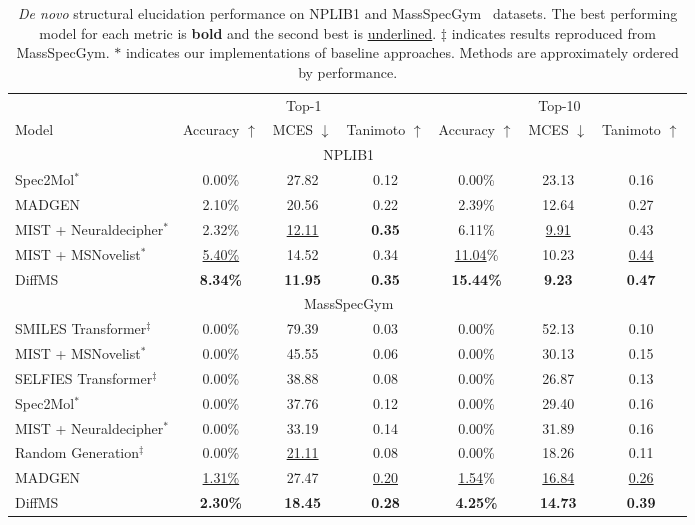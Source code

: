 \documentclass{article}
\theoremstyle{plain}
\theoremstyle{definition}
\theoremstyle{remark}
\begin{document}
\begin{table*}[t]
\caption{\textit{De novo} structural elucidation performance on NPLIB1 \citep{duhrkop2021canopus} and MassSpecGym~\citep{bushuiev2024massspecgymbenchmarkdiscoveryidentification} datasets. The best performing model for each metric is \textbf{bold} and the second best is \underline{underlined}. $\ddag$ indicates results reproduced from MassSpecGym.
$*$ indicates our implementations of baseline approaches. Methods are approximately ordered by performance.
}
\vspace{-0.05in}
\label{table:main}
\begin{center}
{
\begin{tabular}{lcccccc}
\toprule
& \multicolumn{3}{c}{Top-1} & \multicolumn{3}{c}{Top-10} \\
\cmidrule(lr){2-4}
\cmidrule(lr){5-7}
Model & Accuracy $\uparrow$ & MCES $\downarrow$ & Tanimoto $\uparrow$ & Accuracy $\uparrow$ & MCES $\downarrow$ & Tanimoto $\uparrow$ \\
\midrule
\midrule
& \multicolumn{4}{c}{NPLIB1} & & \\
\midrule
Spec2Mol$^*$ & 0.00\% & 27.82 & 0.12 & 0.00\% & 23.13 & 0.16 \\
MADGEN & 2.10\% & 20.56 & 0.22 & 2.39\% & 12.64 & 0.27 \\
MIST + Neuraldecipher$^*$ & 2.32\% & \underline{12.11} & \textbf{0.35} & 6.11\% & \underline{9.91} & 0.43 \\
MIST + MSNovelist$^*$ & \underline{5.40\%} & 14.52 & 0.34 & \underline{11.04}\% & 10.23 & \underline{0.44} \\
DiffMS & \textbf{8.34\%} & \textbf{11.95} & \textbf{0.35} & \textbf{15.44\%} & \textbf{9.23} & \textbf{0.47} \\
\midrule
& \multicolumn{4}{c}{MassSpecGym} & & \\
\midrule
SMILES Transformer$^\ddag$ & 0.00\% &  79.39 & 0.03 & 0.00\% & 52.13 & 0.10 \\
MIST + MSNovelist$^*$ & 0.00\% & 45.55 & 0.06 & 0.00\% & 30.13 & 0.15 \\
SELFIES Transformer$^\ddag$ & 0.00\% & 38.88 & 0.08 & 0.00\% & 26.87 & 0.13 \\
Spec2Mol$^*$ & 0.00\% & 37.76 & 0.12 & 0.00\% & 29.40 & 0.16\\
MIST + Neuraldecipher$^*$ & 0.00\% & 33.19 & 0.14 & 0.00\% & 31.89 & 0.16 \\
Random Generation$^\ddag$ & 0.00\% & \underline{21.11} & 0.08 & 0.00\% & 18.26 & 0.11 \\
MADGEN & \underline{1.31\%} & 27.47 & \underline{0.20} & \underline{1.54}\% & \underline{16.84} & \underline{0.26} \\
DiffMS & \textbf{2.30\%} & \textbf{18.45} & \textbf{0.28} & \textbf{4.25\%} & \textbf{14.73} & \textbf{0.39} \\
\bottomrule
\end{tabular}
}
\end{center}
\vskip -0.1in
\end{table*}
\end{document}

